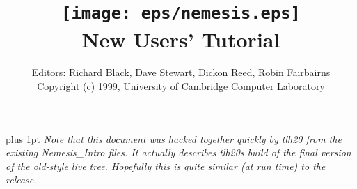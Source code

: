 \documentclass{book}
\newcommand\bogosity[1]{{\it #1}}
\begin{document}
\title{
  \texttt{[image: eps/nemesis.eps]} \\[1.5in]
  \Huge New Users' Tutorial
}

\author{Editors: Richard Black, Dave Stewart, Dickon Reed, Robin Fairbairns\\[0.5cm]
   Copyright (c) 1999, University of Cambridge Computer
   Laboratory}

\thispagestyle{empty}
\maketitle
\clearpage

{ \parskip 0pt plus 1pt
\tableofcontents
\bogosity{Note that this document was hacked together quickly by tlh20
from the existing Nemesis\_Intro files.  It actually describes tlh20s
build of the final version of the old-style live tree.  Hopefully this
is quite similar (at run time) to the release.}

}

\clearpage
{}




 



\end{document}
